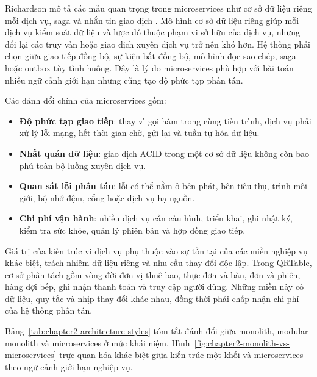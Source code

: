 Richardson mô tả các mẫu quan trọng trong microservices như cơ sở dữ liệu riêng mỗi dịch vụ, saga và nhắn tin giao dịch \cite{richardson-microservices-patterns-2018}. Mô hình cơ sở dữ liệu riêng giúp mỗi dịch vụ kiểm soát dữ liệu và lược đồ thuộc phạm vi sở hữu của dịch vụ, nhưng đổi lại các truy vấn hoặc giao dịch xuyên dịch vụ trở nên khó hơn. Hệ thống phải chọn giữa giao tiếp đồng bộ, sự kiện bất đồng bộ, mô hình đọc sao chép, saga hoặc outbox tùy tình huống. Đây là lý do microservices phù hợp với bài toán nhiều ngữ cảnh giới hạn nhưng cũng tạo độ phức tạp phân tán.

Các đánh đổi chính của microservices gồm:

\begin{itemize}
  \item \textbf{Độ phức tạp giao tiếp}: thay vì gọi hàm trong cùng tiến trình, dịch vụ phải xử lý lỗi mạng, hết thời gian chờ, gửi lại và tuần tự hóa dữ liệu.
  \item \textbf{Nhất quán dữ liệu}: giao dịch ACID trong một cơ sở dữ liệu không còn bao phủ toàn bộ luồng xuyên dịch vụ.
  \item \textbf{Quan sát lỗi phân tán}: lỗi có thể nằm ở bên phát, bên tiêu thụ, trình môi giới, bộ nhớ đệm, cổng hoặc dịch vụ hạ nguồn.
  \item \textbf{Chi phí vận hành}: nhiều dịch vụ cần cấu hình, triển khai, ghi nhật ký, kiểm tra sức khỏe, quản lý phiên bản và hợp đồng giao tiếp.
\end{itemize}

Giá trị của kiến trúc vi dịch vụ phụ thuộc vào sự tồn tại của các miền nghiệp vụ khác biệt, trách nhiệm dữ liệu riêng và nhu cầu thay đổi độc lập. Trong QRTable, cơ sở phân tách gồm vòng đời đơn vị thuê bao, thực đơn và bàn, đơn và phiên, hàng đợi bếp, ghi nhận thanh toán và truy cập người dùng. Những miền này có dữ liệu, quy tắc và nhịp thay đổi khác nhau, đồng thời phải chấp nhận chi phí của hệ thống phân tán.

Bảng~\ref{tab:chapter2-architecture-styles} tóm tắt đánh đổi giữa monolith, modular monolith và microservices ở mức khái niệm. Hình~\ref{fig:chapter2-monolith-vs-microservices} trực quan hóa khác biệt giữa kiến trúc một khối và microservices theo ngữ cảnh giới hạn nghiệp vụ.

